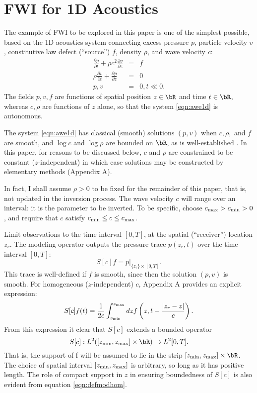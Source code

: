 \section{FWI for 1D Acoustics}
The example of FWI to be explored in this paper is one of the simplest possible, based on the 1D acoustics system connecting excess pressure $p$, particle velocity $v$, constitutive law defect (``source'') $f$, density $\rho$, and wave velocity $c$:
\begin{eqnarray}
\label{eqn:awe1d}
\frac{\partial p}{\partial t} + \rho c^2\frac{\partial 
  v}{\partial z} &=& f \nonumber\\
\rho \frac{\partial v}{\partial t} + \frac{\partial p}{\partial 
  z}&=&0\nonumber\\
 p,v&=&0, t \ll 0. 
\end{eqnarray}
The fields $p,v,f$ are functions of spatial position $z \in \bR$ and time $t \in \bR$, whereas $c, \rho$ are functions of $z$ alone, so that the system \ref{eqn:awe1d} is autonomous.

The system \ref{eqn:awe1d} has classical (smooth) solutions $(p,v)$
when $c, \rho,$ and $f$ are smooth, and $\log c$ and $\log \rho$ are
bounded on $\bR$, as is well-established \cite[]{Lax:PDENotes}. In
this paper, for reasons to be discussed below, $c$ and $\rho$ are
constrained to be constant ($z$-independent) in which case solutions
may be constructed by elementary methods (Appendix A). 

In fact, I shall assume $\rho>0$ to be fixed for the remainder of this
paper, that is, not updated in the inversion process. The wave
velocity $c$ will range over an interval: it is the parameter to be inverted.
To be specific, choose $c_{\rm max} > c_{\rm min} > 0$, and require
that $c$ satisfy $c_{\rm min} \le c \le c_{\rm max}$.

Limit observations to the time interval $[0,T]$, at the spatial (``receiver'')  location $z_r$. The modeling operator outputs the pressure trace $p(z_r,t)$ over the time interval $[0,T]$:
\begin{equation}
  \label{eqn:defmod}
  S[c]f = p|_{\{z_r\}\times [0,T]}.
\end{equation}
This trace is well-defined if $f$ is smooth, since then the solution
$(p,v)$ is smooth.
For homogeneous ($z$-independent) $c$, Appendix A provides an explicit expression:
\begin{equation}
  \label{eqn:defmodhom}
  S[c]f(t) = \frac{1}{2c}\int_{z_{\rm min}}^{z_{\rm max}} dz f\left(z,t - \frac{|z_r-z|}{c}\right). 
\end{equation}
From this expression it clear that $S[c]$ extends a bounded
operator
\begin{equation}
  \label{eqn:defmoddom}
  S[c]: L^2([z_{\rm min},z_{\rm max}] \times \bR) \rightarrow L^2[0,T].
\end{equation}
That is, the support of f will be assumed to lie in the strip $[z_{\rm
  min},z_{\rm max}] \times \bR$.  The choice of spatial interval
$[z_{\rm min},z_{\rm max}]$ is arbitrary, so long as it has positive
length. The role of compact support in $z$ in ensuring
boundedness of $S[c]$ is also evident from equation \ref{eqn:defmodhom}.

